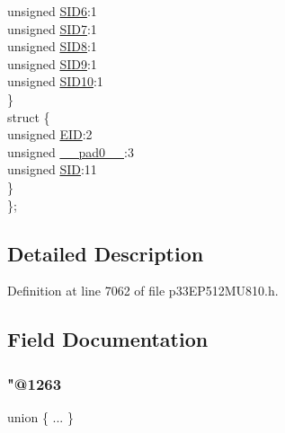 \begin{DoxyCompactItemize}
\begin{tabbing}
\>\>unsigned \hyperlink{structtag_c2_r_x_f15_s_i_d_b_i_t_s_a70d70952133eb2389d5c326f9f0e8035}{SID6}:1\\
\>\>unsigned \hyperlink{structtag_c2_r_x_f15_s_i_d_b_i_t_s_a34097fb76decd431701fa2d86a22328e}{SID7}:1\\
\>\>unsigned \hyperlink{structtag_c2_r_x_f15_s_i_d_b_i_t_s_afe74894633244fdb0b0c01b4e8c522e7}{SID8}:1\\
\>\>unsigned \hyperlink{structtag_c2_r_x_f15_s_i_d_b_i_t_s_a33587704948067005c2a6a3ccc503c99}{SID9}:1\\
\>\>unsigned \hyperlink{structtag_c2_r_x_f15_s_i_d_b_i_t_s_a1a9084031c7f5fb16007feeebf0d8216}{SID10}:1\\
\>\} \\
\>struct \{\\
\>\>unsigned \hyperlink{structtag_c2_r_x_f15_s_i_d_b_i_t_s_ae80b378c9141f7c03e0b4e55b5f4b54d}{EID}:2\\
\>\>unsigned \hyperlink{structtag_c2_r_x_f15_s_i_d_b_i_t_s_adf71f3d8410c1f1dbbc96680a92c49af}{\_\_pad0\_\_}:3\\
\>\>unsigned \hyperlink{structtag_c2_r_x_f15_s_i_d_b_i_t_s_af88edf93b2fee2432665bd84f51287e4}{SID}:11\\
\>\} \\
\}; \\

\end{tabbing}\end{DoxyCompactItemize}


\subsection{Detailed Description}


Definition at line 7062 of file p33\+E\+P512\+M\+U810.\+h.



\subsection{Field Documentation}
\mbox{\label{structtag_c2_r_x_f15_s_i_d_b_i_t_s_a519a3585623d0c6efb8343534f90ccce}} 
\subsubsection{\texorpdfstring{"@1263}{@1263}}
{\footnotesize\ttfamily union \{ ... \} }

\mbox{\label{structtag_c2_r_x_f15_s_i_d_b_i_t_s_adf71f3d8410c1f1dbbc96680a92c49af}} 
